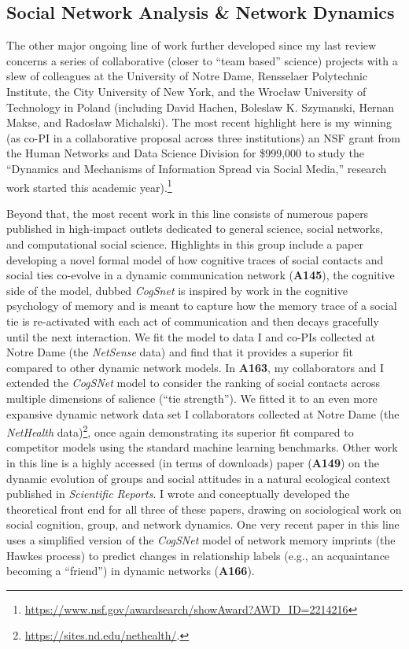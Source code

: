 \documentclass[a4paper,11pt]{extarticle}
\begin{document}
\subsection*{Social Network Analysis \& Network Dynamics}
The other major ongoing line of work further developed since my last review concerns a series of collaborative (closer to ``team based'' science) projects with a slew of colleagues at the University of Notre Dame, Rensselaer Polytechnic Institute, the City University of New York, and the Wroc\l{}aw University of Technology in Poland (including David Hachen, Boleslaw K. Szymanski, Hernan Makse, and Rados\l{}aw Michalski). The most recent highlight here is my winning (as co-PI in a collaborative proposal across three institutions) an NSF grant from the Human Networks and Data Science Division for \$999,000 to study the ``Dynamics and Mechanisms of Information Spread via Social Media,'' research work started this academic year).\footnote{\href{https://www.nsf.gov/awardsearch/showAward?AWD\_ID=2214216}{https://www.nsf.gov/awardsearch/showAward?AWD\_ID=2214216}}

Beyond that, the most recent work in this line consists of numerous papers published in high-impact outlets dedicated to general science, social networks, and computational social science. Highlights in this group include a paper developing a novel formal model of how cognitive traces of social contacts and social ties co-evolve in a dynamic communication network (\textbf{A145}), the cognitive side of the model, dubbed \textit{CogSnet} is inspired by work in the cognitive psychology of memory and is meant to capture how the memory trace of a social tie is re-activated with each act of communication and then decays gracefully until the next interaction. We fit the model to data I and co-PIs collected at Notre Dame (the \textit{NetSense} data) and find that it provides a superior fit compared to other dynamic network models. In \textbf{A163}, my collaborators and I extended the \textit{CogSNet} model to consider the ranking of social contacts across multiple dimensions of salience (``tie strength''). We fitted it to an even more expansive dynamic network data set I collaborators collected at Notre Dame (the \textit{NetHealth} data)\footnote{\href{https://sites.nd.edu/nethealth/}{https://sites.nd.edu/nethealth/}.}, once again demonstrating its superior fit compared to competitor models using the standard machine learning benchmarks.  Other work in this line is a highly accessed (in terms of downloads) paper (\textbf{A149}) on the dynamic evolution of groups and social attitudes in a natural ecological context published in \textit{Scientific Reports}. I wrote and conceptually developed the theoretical front end for all three of these papers, drawing on sociological work on social cognition, group, and network dynamics. One very recent paper in this line uses a simplified version of the \textit{CogSNet} model of network memory imprints (the Hawkes process) to predict changes in relationship labels (e.g., an acquaintance becoming a ``friend'') in dynamic networks (\textbf{A166}).
\end{document}
